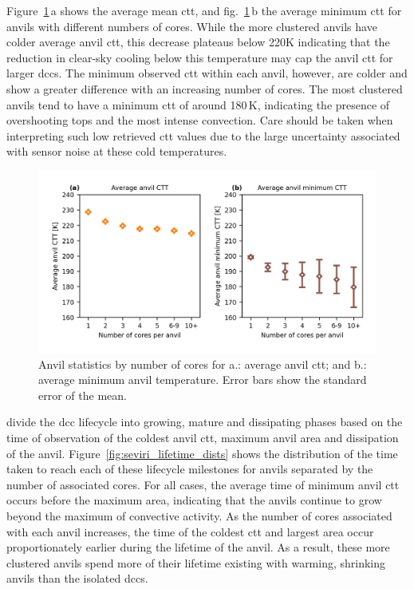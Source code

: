 Figure~\ref{fig:seviri_anvil_ctt_stats}\,a shows the average mean \acrshort{ctt}, and fig.~\ref{fig:seviri_anvil_ctt_stats}\,b the average minimum \acrshort{ctt} for anvils with different numbers of cores. 
While the more clustered anvils have colder average anvil \acrshort{ctt}, this decrease plateaus below 220K indicating that the reduction in clear-sky cooling below this temperature may cap the anvil \acrshort{ctt} for larger \acrshort{dcc}s. 
The minimum observed \acrshort{ctt} within each anvil, however, are colder and show a greater difference with an increasing number of cores. 
The most clustered anvils tend to have a minimum \acrshort{ctt} of around 180\,\unit{K}, indicating the presence of overshooting tops and the most intense convection. 
Care should be taken when interpreting such low retrieved \acrshort{ctt} values due to the large uncertainty associated with sensor noise at these cold temperatures.


\begin{figure}[tp]
    \includegraphics[width=\textwidth]{figures/chapter4_10.png}
    \caption[
    Anvil statistics by number of cores for average anvil \acrshort{ctt} and average minimum anvil temperature
    ]{
    Anvil statistics by number of cores for a.: average anvil \acrshort{ctt}; and b.: average minimum anvil temperature. Error bars show the standard error of the mean.
    }
    \label{fig:seviri_anvil_ctt_stats}
\end{figure}


\citet{futyan_deep_2007} divide the \acrshort{dcc} lifecycle into growing, mature and dissipating phases based on the time of observation of the coldest anvil \acrshort{ctt}, maximum anvil area and dissipation of the anvil. 
Figure~\ref{fig:seviri_lifetime_dists} shows the distribution of the time taken to reach each of these lifecycle milestones for anvils separated by the number of associated cores. 
For all cases, the average time of minimum anvil \acrshort{ctt} occurs before the maximum area, indicating that the anvils continue to grow beyond the maximum of convective activity. 
As the number of cores associated with each anvil increases, the time of the coldest \acrshort{ctt} and largest area occur proportionately earlier during the lifetime of the anvil. 
As a result, these more clustered anvils spend more of their lifetime existing with warming, shrinking anvils than the isolated \acrshort{dcc}s.



